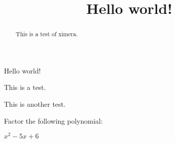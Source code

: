 \documentclass{ximera}
\begin{document}
\title{Hello world!}

\begin{abstract}
This is a test of ximera.
\end{abstract}

\maketitle

Hello world!

This is a test.

This is another test.

\begin{exercise}
Factor the following polynomial:

$x^2 - 5x + 6$ 
\end{exercise}
\end{document}
